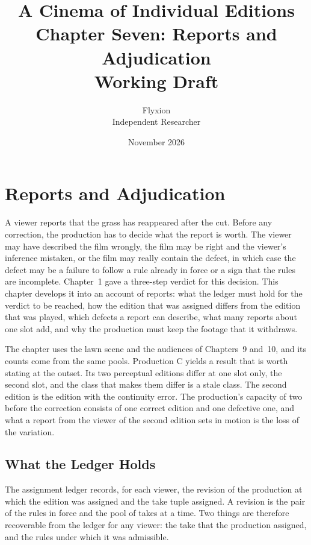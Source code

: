 \documentclass[11pt,twoside,openright]{book}
\title{\Huge\bfseries A Cinema of Individual Editions\\[1.2ex]
\large Chapter Seven: Reports and Adjudication\\[0.4ex]
\large Working Draft}
\author{Flyxion\\[0.3ex]\small Independent Researcher}
\date{November 2026}
\theoremstyle{plain}
\theoremstyle{definition}
\theoremstyle{remark}
\begin{document}
\frontmatter
\maketitle
\tableofcontents
\mainmatter
\setcounter{chapter}{6}

\chapter{Reports and Adjudication}
\label{ch:reports}

A viewer reports that the grass has reappeared after the cut. Before any correction, the production has to decide what the report is worth. The viewer may have described the film wrongly, the film may be right and the viewer's inference mistaken, or the film may really contain the defect, in which case the defect may be a failure to follow a rule already in force or a sign that the rules are incomplete. Chapter~1 gave a three-step verdict for this decision. This chapter develops it into an account of reports: what the ledger must hold for the verdict to be reached, how the edition that was assigned differs from the edition that was played, which defects a report can describe, what many reports about one slot add, and why the production must keep the footage that it withdraws.

The chapter uses the lawn scene and the audiences of Chapters~9 and~10, and its counts come from the same pools. Production C yields a result that is worth stating at the outset. Its two perceptual editions differ at one slot only, the second slot, and the class that makes them differ is a stale class. The second edition is the edition with the continuity error. The production's capacity of two before the correction consists of one correct edition and one defective one, and what a report from the viewer of the second edition sets in motion is the loss of the variation.

\section{What the Ledger Holds}\label{sec:ledger}

The assignment ledger records, for each viewer, the revision of the production at which the edition was assigned and the take tuple assigned. A revision is the pair of the rules in force and the pool of takes at a time. Two things are therefore recoverable from the ledger for any viewer: the take that the production assigned, and the rules under which it was admissible.
\end{document}
